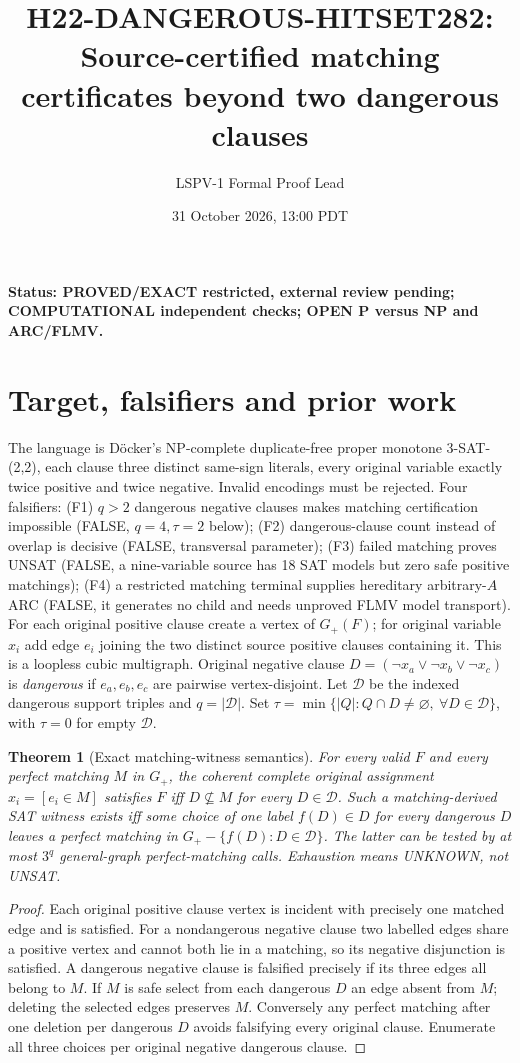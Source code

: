 \documentclass[11pt]{article}
\title{H22-DANGEROUS-HITSET282: Source-certified matching certificates beyond two dangerous clauses}
\author{LSPV-1 Formal Proof Lead}\date{31 October 2026, 13:00 PDT}
\newtheorem{theorem}{Theorem}
\begin{document}
\maketitle
\textbf{Status: PROVED/EXACT restricted, external review pending; COMPUTATIONAL independent checks; OPEN P versus NP and ARC/FLMV.}
\section{Target, falsifiers and prior work}
The language is D\"ocker's NP-complete duplicate-free proper monotone 3-SAT-(2,2), each clause three distinct same-sign literals, every original variable exactly twice positive and twice negative. Invalid encodings must be rejected. Four falsifiers: (F1) $q>2$ dangerous negative clauses makes matching certification impossible (FALSE, $q=4,\tau=2$ below); (F2) dangerous-clause count instead of overlap is decisive (FALSE, transversal parameter); (F3) failed matching proves UNSAT (FALSE, a nine-variable source has 18 SAT models but zero safe positive matchings); (F4) a restricted matching terminal supplies hereditary arbitrary-$A$ ARC (FALSE, it generates no child and needs unproved FLMV model transport).
For each original positive clause create a vertex of $G_+(F)$; for original variable $x_i$ add edge $e_i$ joining the two distinct source positive clauses containing it. This is a loopless cubic multigraph. Original negative clause $D=(\neg x_a\vee\neg x_b\vee\neg x_c)$ is \emph{dangerous} if $e_a,e_b,e_c$ are pairwise vertex-disjoint. Let $\mathcal D$ be the indexed dangerous support triples and $q=|\mathcal D|$. Set $\tau=\min\{|Q|:Q\cap D\ne\varnothing,\ \forall D\in\mathcal D\}$, with $\tau=0$ for empty $\mathcal D$.
\begin{theorem}[Exact matching-witness semantics]
For every valid $F$ and every perfect matching $M$ in $G_+$, the coherent complete original assignment $x_i=[e_i\in M]$ satisfies $F$ iff $D\nsubseteq M$ for every $D\in\mathcal D$. Such a matching-derived SAT witness exists iff some choice of one label $f(D)\in D$ for every dangerous $D$ leaves a perfect matching in $G_+-\{f(D):D\in\mathcal D\}$. The latter can be tested by at most $3^q$ general-graph perfect-matching calls. Exhaustion means UNKNOWN, not UNSAT.
\end{theorem}
\begin{proof}
Each original positive clause vertex is incident with precisely one matched edge and is satisfied. For a nondangerous negative clause two labelled edges share a positive vertex and cannot both lie in a matching, so its negative disjunction is satisfied. A dangerous negative clause is falsified precisely if its three edges all belong to $M$. If $M$ is safe select from each dangerous $D$ an edge absent from $M$; deleting the selected edges preserves $M$. Conversely any perfect matching after one deletion per dangerous $D$ avoids falsifying every original clause. Enumerate all three choices per original negative dangerous clause.
\end{proof}
\end{document}
